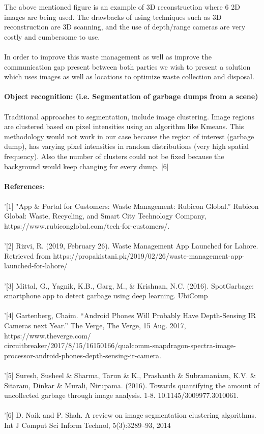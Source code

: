 The above mentioned figure is an example of 3D reconstruction where 6 2D images are being used.
The drawbacks of using techniques such as  3D reconstruction are 3D scanning, and the use of depth/range cameras are very costly and cumbersome to use.\\
\\
In order to improve this waste management as well as improve the communication gap present between both parties we wish to present a solution which uses images as well as locations to optimize waste collection and disposal.\\ \\
\textbf{Object recognition: (i.e. Segmentation of garbage dumps from a scene)}\\
\\
Traditional approaches to segmentation, include image clustering. Image regions are clustered based on pixel intensities using an algorithm like Kmeans. This methodology would not work in our case because the region of interest (garbage dump), has varying pixel intensities in random distributions (very high spatial frequency). Also the number of clusters could not be fixed because the background would keep changing for every dump. [6]\\
\\
\textbf{References}:\\
\\
'[1] "App \& Portal for Customers: Waste Management: Rubicon Global.” Rubicon Global: Waste, Recycling, and Smart City Technology Company,\\ https://www.rubiconglobal.com/tech-for-customers/.\\
\\
'[2] Rizvi, R. (2019, February 26). Waste Management App Launched for Lahore. Retrieved from https://propakistani.pk/2019/02/26/waste-management-app-launched-for-lahore/\\
\\
'[3] Mittal, G., Yagnik, K.B., Garg, M., \& Krishnan, N.C. (2016). SpotGarbage: smartphone app to detect garbage using deep learning. UbiComp\\
\\
'[4] Gartenberg, Chaim. “Android Phones Will Probably Have Depth-Sensing IR Cameras next Year.” The Verge, The Verge, 15 Aug. 2017, https://www.theverge.com/\\circuitbreaker/2017/8/15/16150166/qualcomm-snapdragon-spectra-image-processor-android-phones-depth-sensing-ir-camera.\\
\\
'[5] Suresh, Susheel \& Sharma, Tarun \& K., Prashanth \& Subramaniam, K.V. \& Sitaram, Dinkar \& Murali, Nirupama. (2016). Towards quantifying the amount of uncollected garbage through image analysis. 1-8. 10.1145/3009977.3010061.\\
\\
'[6] D. Naik and P. Shah. A review on image segmentation clustering algorithms. Int J Comput Sci Inform Technol, 5(3):3289–93, 2014
